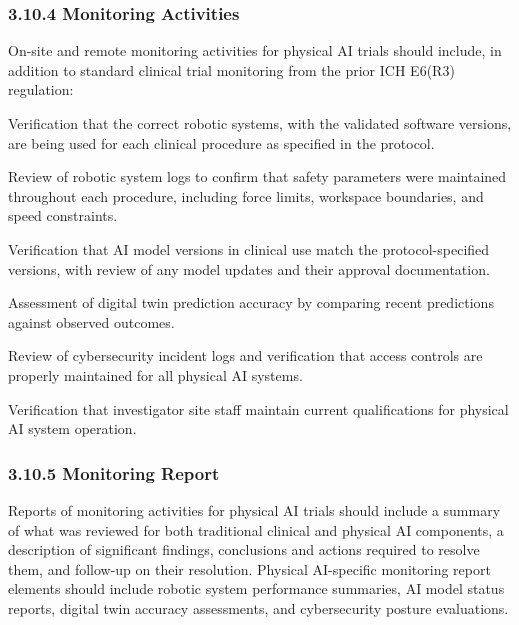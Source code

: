 \documentclass[11pt]{article}
\begin{document}
\subsubsection{3.10.4 Monitoring Activities}

On-site and remote monitoring activities for physical AI trials should include, in addition to standard clinical trial monitoring from the prior ICH E6(R3) regulation:

\begin{description}[leftmargin=2.5cm,style=sameline]

\item[(a)] Verification that the correct robotic systems, with the validated software versions, are being used for each clinical procedure as specified in the protocol.

\item[(b)] Review of robotic system logs to confirm that safety parameters were maintained throughout each procedure, including force limits, workspace boundaries, and speed constraints.

\item[(c)] Verification that AI model versions in clinical use match the protocol-specified versions, with review of any model updates and their approval documentation.

\item[(d)] Assessment of digital twin prediction accuracy by comparing recent predictions against observed outcomes.

\item[(e)] Review of cybersecurity incident logs and verification that access controls are properly maintained for all physical AI systems.

\item[(f)] Verification that investigator site staff maintain current qualifications for physical AI system operation.

\end{description}

\subsubsection{3.10.5 Monitoring Report}

Reports of monitoring activities for physical AI trials should include a summary of what was reviewed for both traditional clinical and physical AI components, a description of significant findings, conclusions and actions required to resolve them, and follow-up on their resolution. Physical AI-specific monitoring report elements should include robotic system performance summaries, AI model status reports, digital twin accuracy assessments, and cybersecurity posture evaluations.
\end{document}
